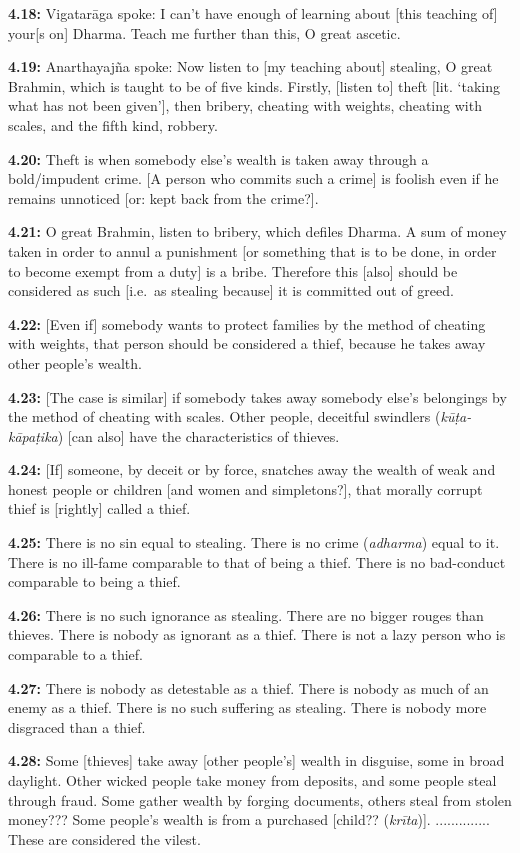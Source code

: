 \documentclass{article}
\newcommand{\vsnum}[1]{\textbf{#1}}
\newcommand{\skt}[1]{\textit{#1}}
\begin{document}
\vsnum{4.18: }Vigatarāga spoke: I can't have enough of learning about [this teaching of] your[s on] Dharma. Teach me further than this, O great ascetic.

\vsnum{4.19: }Anarthayajña spoke: Now listen to [my teaching about] stealing, O great Brahmin, which is taught to be of five kinds. Firstly, [listen to] theft [lit. `taking what has not been given'], then bribery, cheating with weights, cheating with scales, and the fifth kind, robbery.

\vsnum{4.20: }Theft is when somebody else's wealth is taken away through a bold/impudent crime. [A person who commits such a crime] is foolish even if he remains unnoticed [or: kept back from the crime?].

\vsnum{4.21: }O great Brahmin, listen to bribery, which defiles Dharma. A sum of money taken in order to annul a punishment [or something that is to be done, in order to become exempt from a duty] is a bribe. Therefore this [also] should be considered as such [i.e.\ as stealing because] it is committed out of greed.

\vsnum{4.22: }[Even if] somebody wants to protect families by the method of cheating with weights, that person should be considered a thief, because he takes away other people's wealth.

\vsnum{4.23: }[The case is similar] if somebody takes away somebody else's belongings by the method of cheating with scales. Other people, deceitful swindlers (\skt{kūṭa-kāpaṭika}) [can also] have the characteristics of thieves.

\vsnum{4.24: }[If] someone, by deceit or by force, snatches away the wealth of weak and honest people or children [and women and simpletons?], that morally corrupt thief is [rightly] called a thief.

\vsnum{4.25: }There is no sin equal to stealing. There is no crime (\skt{adharma}) equal to it. There is no ill-fame comparable to that of being a thief. There is no bad-conduct comparable to being a thief.

\vsnum{4.26: }There is no such ignorance as stealing. There are no bigger rouges than thieves. There is nobody as ignorant as a thief. There is not a lazy person who is comparable to a thief.

\vsnum{4.27: }There is nobody as detestable as a thief. There is nobody as much of an enemy as a thief. There is no such suffering as stealing. There is nobody more disgraced than a thief.

\vsnum{4.28: }Some [thieves] take away [other people's] wealth in disguise, some in broad daylight. Other wicked people take money from deposits, and some people steal through fraud. Some gather wealth by forging documents, others steal from stolen money??? Some people's wealth is from a purchased [child?? (\skt{krīta})]. .............. These are considered the vilest.
\end{document}
